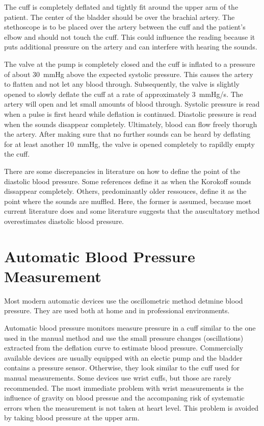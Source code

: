 The cuff is completely deflated and tightly fit around the upper arm of the patient. The center of the bladder should be over the brachial artery. The stethoscope is to be placed over the artery between the cuff and the patient's elbow and should not touch the cuff. This could influence the reading because it puts additional pressure on the artery and can interfere with hearing the sounds.\cite{NHS2019}\cite{Reeves1995}

The valve at the pump is completely closed and the cuff is inflated to a pressure of about \SI{30}{\mmHg} above the expected systolic pressure. This causes the artery to flatten and not let any blood through. Subsequently, the valve is slightly opened to slowly deflate the cuff at a rate of approximately \SI{3}{\mmHg/\second}. The artery will open and let small amounts of blood through. Systolic pressure is read when a pulse is first heard while deflation is continued. Diastolic pressure is read when the sounds disappear completely. Ultimately, blood can flow freely thorugh the artery. After making sure that no further sounds can be heard by deflating for at least another \SI{10}{\mmHg}, the valve is opened completely to rapildly empty the cuff.   \cite{NHS2019,Reeves1995}

There are some discrepancies in literature on how to define the point of the diastolic blood pressure. Some references define it as when the Korokoff sounds dissappear completely. \cite{NHS2019,Reeves1995} Others, predominantly older ressouces, define it as the point where the sounds are muffled.\cite{Boron2012} Here, the former is assumed, because most current literature does and some literature suggests that the auscultatory method overestimates diastolic blood pressure. \cite{Chandrasekhar2019} 


\section{Automatic Blood Pressure Measurement}

Most modern automatic devices use the oscillometric method detmine blood pressure. They are used both at home and in professional environments. 

Automatic blood pressure monitors measure pressure in a cuff similar to the one used in the manual method and use the small pressure changes (oscillations) extracted from the deflation curve to estimate blood pressure. Commercially available devices are usually equipped with an electic pump and the bladder contains a pressure sensor. Otherwise, they look similar to the cuff used for manual measurements. Some devices use wrist cuffs, but those are rarely recommended. \cite{BIHSOC2020} The most immediate problem with wrist measurements is the influence of gravity on blood pressue and the accompaning risk of systematic errors when the measurement is not taken at heart level. \cite{Boron2012} This problem is avoided by taking blood pressure at the upper arm. 

